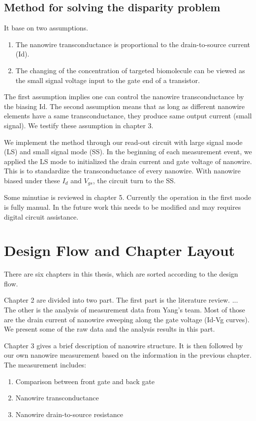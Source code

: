\subsection*{Method for solving the disparity problem}
It base on two assumptions.
\begin{enumerate}
    \item The nanowire transconductance is proportional to the drain-to-source current (Id).
    \item The changing of the concentration of targeted biomolecule can be viewed as the small signal voltage input to the gate end of a transistor.
\end{enumerate}
The first assumption implies one can control the nanowire transconductance by the biasing Id.
The second assumption means that as long as different nanowire elements have a same transconductance, they produce same output current (small signal).
We testify these assumption in chapter 3.

We implement the method through our read-out circuit with large signal mode (LS) and small signal mode (SS).
In the beginning of each measurement event, we applied the LS mode to initialized the drain current and gate voltage of nanowire.
This is to standardize the transconductance of every nanowire.
With nanowire biased under these $I_d$ and $V_{gs}$, the circuit turn to the SS.

Some minutiae is reviewed in chapter 5.
Currently the operation in the first mode is fully manual.
In the future work this needs to be modified and may requires digital circuit assistance.


\section{Design Flow and Chapter Layout}
There are six chapters in this thesis, which are sorted according to the design flow.

Chapter 2 are divided into two part.
The first part is the literature review. {\color{red}...} The other is the analysis of measurement data from Yang's team.
Most of those are the drain current of nanowire sweeping along the gate voltage (Id-Vg curves).
We present some of the raw data and the analysis results in this part.

Chapter 3 gives a brief description of nanowire structure.
It is then followed by our own nanowire measurement based on the information in the previous chapter.
The measurement includes:

\begin{enumerate}
\item Comparison between front gate and back gate
\item Nanowire transconductance
\item Nanowire drain-to-source resistance
\end{enumerate}

